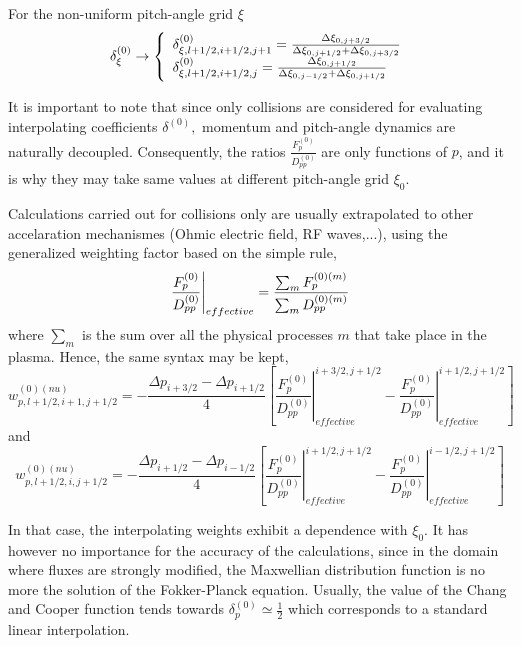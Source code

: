 For the non-uniform pitch-angle grid $\xi $%
\begin{equation}
\delta _{\xi }^{\left( 0\right) }\rightarrow \left\{
\begin{array}{l}
\delta _{\xi ,l+1/2,i+1/2,j+1}^{\left( 0\right) }=\frac{\Delta \xi _{0,j+3/2}%
}{\Delta \xi _{0,j+1/2}+\Delta \xi _{0,j+3/2}} \\
\delta _{\xi ,l+1/2,i+1/2,j}^{\left( 0\right) }=\frac{\Delta \xi _{0,j+1/2}}{%
\Delta \xi _{0,j-1/2}+\Delta \xi _{0,j+1/2}}
\end{array}
\right.
\end{equation}

It is important to note that since only collisions are considered for
evaluating interpolating coefficients $\delta ^{\left( 0\right) },$ momentum
and pitch-angle dynamics are naturally decoupled. Consequently, the ratios $%
\frac{F_{p}^{\left( 0\right) }}{D_{pp}^{\left( 0\right) }}$ are only
functions of $p$, and it is why they may take same values at different
pitch-angle grid $\xi _{0}.$

Calculations carried out for collisions only are usually extrapolated to
other accelaration mechanismes (Ohmic electric field, RF waves,...), using
the generalized weighting factor based on the simple rule,
\begin{equation}
\left. \frac{F_{p}^{\left( 0\right) }}{D_{pp}^{\left( 0\right) }}\right|
_{effective}=\frac{\sum_{m}F_{p}^{\left( 0\right) (m)}}{\sum_{m}D_{pp}^{%
\left( 0\right) (m)}}
\end{equation}
where $\sum_{m}$ is the sum over all the physical processes $m$ that take
place in the plasma. Hence, the same syntax may be kept,
\begin{equation}
w_{p,l+1/2,i+1,j+1/2}^{\left( 0\right) (nu)}=-\frac{\Delta p_{i+3/2}-\Delta
p_{i+1/2}}{4}\left[ \left. \frac{F_{p}^{\left( 0\right) }}{D_{pp}^{\left(
0\right) }}\right| _{effective}^{i+3/2,j+1/2}-\left. \frac{F_{p}^{\left(
0\right) }}{D_{pp}^{\left( 0\right) }}\right|
_{effective}^{i+1/2,j+1/2}\right]
\end{equation}
and
\begin{equation}
w_{p,l+1/2,i,j+1/2}^{\left( 0\right) (nu)}=-\frac{\Delta p_{i+1/2}-\Delta
p_{i-1/2}}{4}\left[ \left. \frac{F_{p}^{\left( 0\right) }}{D_{pp}^{\left(
0\right) }}\right| _{effective}^{i+1/2,j+1/2}-\left. \frac{F_{p}^{\left(
0\right) }}{D_{pp}^{\left( 0\right) }}\right|
_{effective}^{i-1/2,j+1/2}\right]
\end{equation}

In that case, the interpolating weights exhibit a dependence with $\xi _{0}.$
It has however no importance for the accuracy of the calculations, since in
the domain where fluxes are strongly modified, the Maxwellian distribution
function is no more the solution of the Fokker-Planck equation. Usually, the
value of the Chang and Cooper function tends towards $\delta _{p}^{\left(
0\right) }\simeq \frac{1}{2}$ which corresponds to a standard linear
interpolation.

